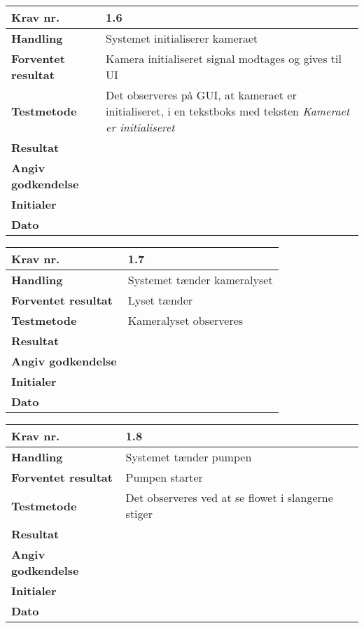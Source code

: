 	\begin{center}
		\begin{longtable}{ | m{4cm}| m{8.5cm}|} 
			\hline
			\textbf{Krav nr.} & 1.6    \\ 
			\hline
			\textbf{Handling} &  Systemet initialiserer kameraet  \\
			\hline
			\textbf{Forventet resultat} &  Kamera initialiseret signal modtages og gives til UI  \\
			\hline
			\textbf{Testmetode}  & Det observeres på GUI, at kameraet er initialiseret, i en tekstboks med teksten \textit{Kameraet er initialiseret}   \\
			\hline
			\textbf{Resultat}  &    \\
			\hline
			\textbf{Angiv godkendelse} &     \\
			\hline
			\textbf{Initialer} &     \\
			\hline
			\textbf{Dato} &    \\
			\hline
		\end{longtable}
	\end{center}

\newpage

	\begin{center}
		\begin{longtable}{ | m{4cm}| m{8.5cm}|} 
			\hline
			\textbf{Krav nr.} & 1.7    \\ 
			\hline
			\textbf{Handling} &  Systemet tænder kameralyset \\
			\hline
			\textbf{Forventet resultat} &  Lyset tænder  \\
			\hline
			\textbf{Testmetode}  & Kameralyset observeres   \\
			\hline
			\textbf{Resultat}  &    \\
			\hline
			\textbf{Angiv godkendelse} &     \\
			\hline
			\textbf{Initialer} &     \\
			\hline
			\textbf{Dato} &    \\
			\hline
		\end{longtable}
	\end{center}

	\begin{center}
		\begin{longtable}{ | m{4cm}| m{8.5cm}|} 
			\hline
			\textbf{Krav nr.} & 1.8    \\ 
			\hline
			\textbf{Handling} &  Systemet tænder pumpen \\
			\hline
			\textbf{Forventet resultat} &  Pumpen starter \\
			\hline
			\textbf{Testmetode}  & Det observeres ved at se flowet i slangerne stiger  \\
			\hline
			\textbf{Resultat}  &    \\
			\hline
			\textbf{Angiv godkendelse} &     \\
			\hline
			\textbf{Initialer} &     \\
			\hline
			\textbf{Dato} &    \\
			\hline
		\end{longtable}
	\end{center}
	
